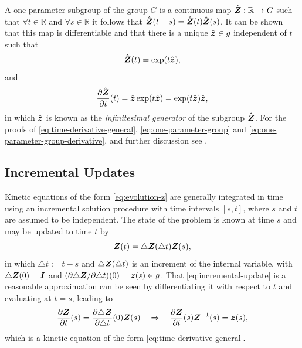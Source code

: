\documentclass[12pt]{article}
\newcommand{\mbb}[1]{\mathbb{#1}}
\begin{document}
A one-parameter subgroup of the group $G$ is a continuous map
$\hat{\bZ} : \mbb{R} \to G$ such that $\forall t \in \mbb{R}$ and
$\forall s \in \mbb{R}$ it follows that $\hat{{\boldsymbol{Z}}}(t+s) =
\hat{{\boldsymbol{Z}}}(t)\hat{{\boldsymbol{Z}}}(s)$. It can be shown that this map is
differentiable and that there is a unique $\hat{{\boldsymbol{z}}} \in g$
independent of $t$ such that
\begin{equation} \label{eq:one-parameter-group}
  \hat{{\boldsymbol{Z}}}(t) = \exp(t \hat{{\boldsymbol{z}}}),
\end{equation}
and
\begin{equation} \label{eq:one-parameter-group-derivative}
  \frac{\partial \hat{{\boldsymbol{Z}}}}{\partial t}(t) =
  \hat{{\boldsymbol{z}}} \exp(t \hat{{\boldsymbol{z}}}) = \exp(t \hat{{\boldsymbol{z}}}) \hat{{\boldsymbol{z}}},
\end{equation}
in which $\hat{{\boldsymbol{z}}}$ is known as the \emph{infinitesimal generator} of
the subgroup $\hat{{\boldsymbol{Z}}}$. For the proofs of
\eqref{eq:time-derivative-general}, \eqref{eq:one-parameter-group} and
\eqref{eq:one-parameter-group-derivative}, and further discussion see
\citet*{Procesi:2006, Sepanski:2007, Kosmann-Schwarzbach:2009,
  Gallier:2011}.

\subsection{Incremental Updates}

Kinetic equations of the form \eqref{eq:evolution-z} are generally
integrated in time using an incremental solution procedure with time
intervals $[s, t]$, where $s$ and $t$ are assumed to be
independent. The state of the problem is known at time $s$ and may be
updated to time $t$ by
\begin{equation} \label{eq:incremental-update}
  {\boldsymbol{Z}}(t) = \triangle {\boldsymbol{Z}}(\triangle t) {\boldsymbol{Z}}(s),
\end{equation}
in which $\triangle t := t-s$ and $\triangle {\boldsymbol{Z}}(\triangle t)$ is an
increment of the internal variable, with $\triangle {\boldsymbol{Z}}(0) = {\boldsymbol{I}}$ and
$(\partial \triangle {\boldsymbol{Z}} / \partial \triangle t)(0) = {\boldsymbol{z}}(s) \in
g$. That \eqref{eq:incremental-update} is a reasonable
approximation can be seen by differentiating it
with respect to $t$ and evaluating at $t = s$, leading to
\begin{equation}\label{eq:evolution-from-update}
  \frac{\partial {\boldsymbol{Z}}}{\partial t}(s) =
  \frac{\partial \triangle {\boldsymbol{Z}}}{\partial \triangle t}(0) {\boldsymbol{Z}}(s)
  \quad
  \Rightarrow
  \quad
  \frac{\partial {\boldsymbol{Z}}}{\partial t}(s) {\boldsymbol{Z}}^{-1}(s) = {\boldsymbol{z}}(s),
\end{equation}
which is a kinetic equation of the form \eqref{eq:time-derivative-general}.
\end{document}

